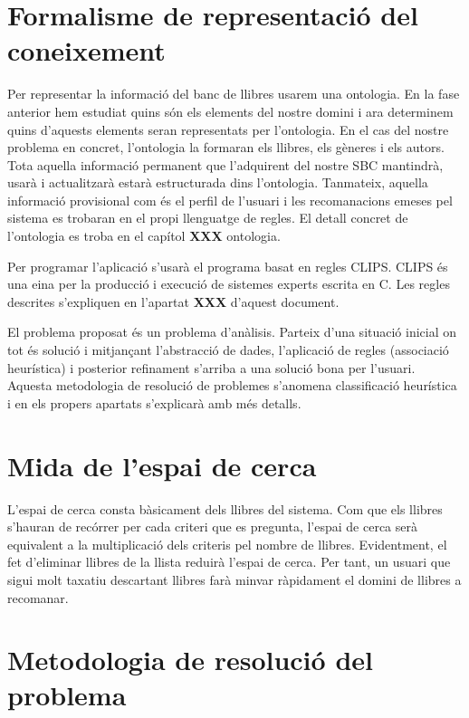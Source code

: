 
\section{Formalisme de representació del coneixement}

Per representar la informació del banc de llibres usarem una ontologia. En la fase anterior hem estudiat quins són els elements del nostre domini i ara determinem quins d'aquests elements seran representats per l'ontologia. En el cas del nostre problema en concret, l'ontologia la formaran els llibres, els gèneres i els autors. Tota aquella informació permanent que l'adquirent del nostre SBC mantindrà, usarà i actualitzarà estarà estructurada dins l'ontologia. Tanmateix, aquella informació provisional com és el perfil de l'usuari i les recomanacions emeses pel sistema es trobaran en el propi llenguatge de regles. El detall concret de l'ontologia es troba en el capítol \textbf{XXX} ontologia.

Per programar l'aplicació s'usarà el programa basat en regles CLIPS. CLIPS és una eina per la producció i execució de sistemes experts escrita en C. Les regles descrites s'expliquen en l'apartat \textbf{XXX} d'aquest document.

El problema proposat és un problema d'anàlisis. Parteix d'una situació inicial on tot és solució i mitjançant l'abstracció de dades, l'aplicació de regles (associació heurística) i posterior refinament s'arriba a una solució bona per l'usuari. Aquesta metodologia de resolució de problemes s'anomena classificació heurística i en els propers apartats s'explicarà amb més detalls.

\section{Mida de l'espai de cerca }

L'espai de cerca consta bàsicament dels llibres del sistema. Com que els llibres s'hauran de recórrer per cada criteri que es pregunta, l'espai de cerca serà equivalent a la multiplicació dels criteris pel nombre de llibres. Evidentment, el fet d'eliminar llibres de la llista reduirà l'espai de cerca. Per tant, un usuari que sigui molt taxatiu descartant llibres farà minvar ràpidament el domini de llibres a recomanar.

\section{Metodologia de resolució del problema}

